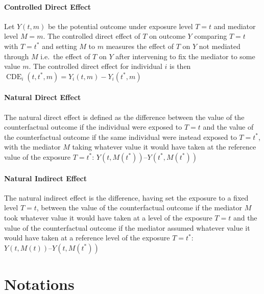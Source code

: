 \documentclass{article}
\theoremstyle{plain}
\theoremstyle{definition}
\theoremstyle{remark}
\theoremstyle{mystyle}
\begin{document}
\paragraph{Controlled Direct Effect}{Let $Y(t,m)$ be the potential outcome under exposure level $T = t$ and mediator level $M = m$. The controlled direct effect of $T$ on outcome $Y$ comparing $T=t$ with $T=t^{*}$ and setting $M$ to $m$ measures the effect of $T$ on $Y$ not mediated through $M$ i.e.\ the effect of $T$ on $Y$ after intervening to fix the mediator to some value $m$. The controlled direct effect for individual $i$ is then $\operatorname{CDE}_i(t, t^*, m)=Y_i(t,m)-Y_i(t^{*},m)$ }
\paragraph{Natural Direct Effect}{The natural direct effect is defined as the difference between the value of the counterfactual outcome if the individual were exposed to $T = t$ and the value of the counterfactual outcome if the same individual were instead exposed to $T = t^*$, with the mediator $M$ taking whatever value it would have taken at the reference value of the exposure $T = t^*$: $Y(t,M(t^*)) – Y(t^*,M(t^*))$ }
\paragraph{Natural Indirect Effect}{The natural indirect effect is the difference, having set the exposure to a fixed level  $T = t$, between the value of the counterfactual outcome if the mediator $M$ took whatever value it would have taken at a level of the exposure $T = t$ and the value of the counterfactual outcome if the mediator assumed whatever value it would have taken at a reference level of the exposure $T = t^*$: $Y(t, M(t)) – Y(t, M(t^*))$ }


\section{Notations} \label{sec:notations}
\end{document}
